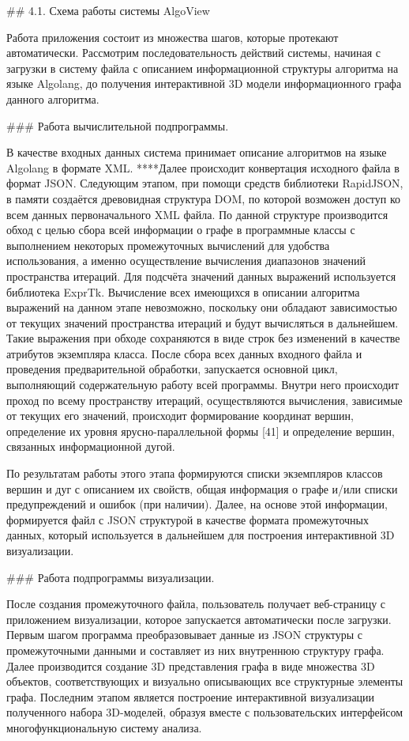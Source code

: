 ## 4.1. Схема работы системы AlgoView

Работа приложения состоит из множества шагов, которые протекают автоматически. Рассмотрим последовательность действий системы, начиная с загрузки в систему файла с описанием информационной структуры алгоритма на языке Algolang, до получения интерактивной 3D модели информационного графа данного алгоритма.

### Работа вычислительной подпрограммы.

В качестве входных данных система принимает описание алгоритмов на языке Algolang в формате XML. ****Далее происходит конвертация исходного файла в формат JSON. Следующим этапом, при помощи средств библиотеки RapidJSON, в памяти создаётся древовидная структура DOM, по которой возможен доступ ко всем данных первоначального XML файла. По данной структуре производится обход с целью сбора всей информации о графе в программные классы с выполнением некоторых промежуточных вычислений для удобства использования, а именно осуществление вычисления диапазонов значений пространства итераций. Для подсчёта значений данных выражений используется библиотека ExprTk. Вычисление всех имеющихся в описании алгоритма выражений на данном этапе невозможно, поскольку они обладают зависимостью от текущих значений пространства итераций и будут вычисляться в дальнейшем. Такие выражения при обходе сохраняются в виде строк без изменений в качестве атрибутов экземпляра класса. После сбора всех данных входного файла и проведения предварительной обработки, запускается основной цикл, выполняющий содержательную работу всей программы. Внутри него происходит проход по всему пространству итераций, осуществляются вычисления, зависимые от текущих его значений, происходит формирование координат вершин, определение их уровня ярусно-параллельной формы [41] и определение вершин, связанных информационной дугой.

По результатам работы этого этапа формируются списки экземпляров классов вершин и дуг с описанием их свойств, общая информация о графе и/или списки предупреждений и ошибок (при наличии). Далее, на основе этой информации, формируется файл с JSON структурой в качестве формата промежуточных данных, который используется в дальнейшем для построения интерактивной 3D визуализации.

### Работа подпрограммы визуализации.

После создания промежуточного файла, пользователь получает веб-страницу с приложением визуализации, которое запускается автоматически после загрузки. Первым шагом программа преобразовывает данные из JSON структуры с промежуточными данными и составляет из них внутреннюю структуру графа. Далее производится создание 3D представления графа в виде множества 3D объектов, соответствующих и визуально описывающих все структурные элементы графа. Последним этапом является построение интерактивной визуализации полученного набора 3D-моделей, образуя вместе с пользовательских интерфейсом многофункциональную систему анализа.

